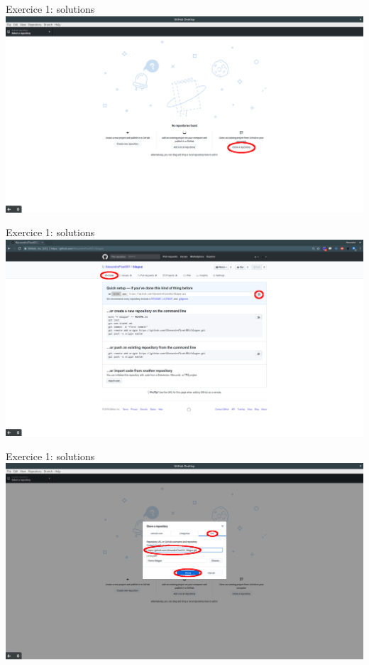 \documentclass{beamer}
\begin{document}
\begin{frame}{Exercice 1: solutions}
    \centering
    \includegraphics[width=\textwidth]{img/image_exercices/clonning_repo.png}
\end{frame}

\begin{frame}{Exercice 1: solutions}
    \centering
    \includegraphics[width=\textwidth]{img/image_exercices/getting_url.png}
\end{frame}

\begin{frame}{Exercice 1: solutions}
    \centering
    \includegraphics[width=\textwidth]{img/image_exercices/cloning_with_url.png}
\end{frame}
\end{document}
